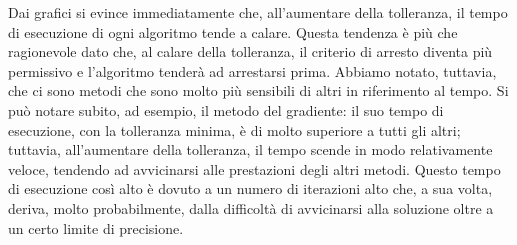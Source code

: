 Dai grafici si evince immediatamente che, all'aumentare della tolleranza, il tempo di esecuzione di ogni algoritmo tende a calare. Questa tendenza è più che ragionevole dato che, al calare della tolleranza, il criterio di arresto diventa più permissivo e l'algoritmo tenderà ad arrestarsi prima. Abbiamo notato, tuttavia, che ci sono metodi che sono molto più sensibili di altri in riferimento al tempo. Si può notare subito, ad esempio, il metodo del gradiente: il suo tempo di esecuzione, con la tolleranza minima, è di molto superiore a tutti gli altri; tuttavia, all'aumentare della tolleranza, il tempo scende in modo relativamente veloce, tendendo ad avvicinarsi alle prestazioni degli altri metodi. Questo tempo di esecuzione così alto è dovuto a un numero di iterazioni alto che, a sua volta, deriva, molto probabilmente, dalla difficoltà di avvicinarsi alla soluzione oltre a un certo limite di precisione.




